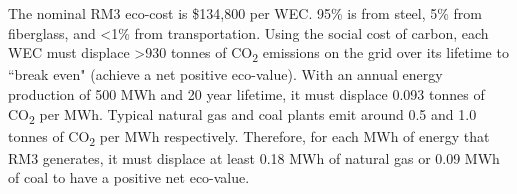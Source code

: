 \documentclass[10pt,twoside]{article}
\begin{document}
\begin{minipage}[m]{0.65\textwidth}
    \vspace{.2\baselineskip}
    \setlength{\parindent}{1.5em}
    The nominal RM3
    eco-cost is \$134,800 per WEC.
    95\% is from steel, 5\% from fiberglass, and <1\% from transportation.
    Using the social cost of carbon, each WEC must displace >930 tonnes of CO\textsubscript{2} emissions on the grid over its lifetime to ``break even" (achieve a net positive eco-value).
    With an annual energy production of 500 MWh and 20 year lifetime, it must displace 0.093 tonnes of CO\textsubscript{2} per MWh.
    Typical natural gas and coal plants emit around 0.5 and 1.0 tonnes of CO\textsubscript{2} per MWh respectively.
    Therefore, for each MWh of energy that RM3 generates, it must displace at least 0.18 MWh of natural gas or 0.09 MWh of coal to have a positive net eco-value.
\end{minipage}
\vspace{-\baselineskip}
\end{document}
